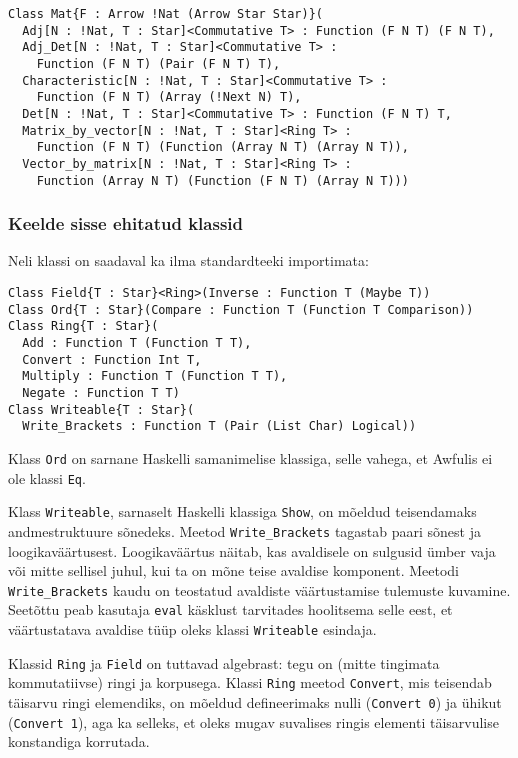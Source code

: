 \documentclass[12pt]{article}
\begin{document}
        \begin{verbatim}Class Mat{F : Arrow !Nat (Arrow Star Star)}(
  Adj[N : !Nat, T : Star]<Commutative T> : Function (F N T) (F N T),
  Adj_Det[N : !Nat, T : Star]<Commutative T> :
    Function (F N T) (Pair (F N T) T),
  Characteristic[N : !Nat, T : Star]<Commutative T> :
    Function (F N T) (Array (!Next N) T),
  Det[N : !Nat, T : Star]<Commutative T> : Function (F N T) T,
  Matrix_by_vector[N : !Nat, T : Star]<Ring T> :
    Function (F N T) (Function (Array N T) (Array N T)),
  Vector_by_matrix[N : !Nat, T : Star]<Ring T> :
    Function (Array N T) (Function (F N T) (Array N T)))\end{verbatim}
      \subsubsection{Keelde sisse ehitatud klassid}
        Neli klassi on saadaval ka ilma standardteeki importimata:

        \begin{verbatim}Class Field{T : Star}<Ring>(Inverse : Function T (Maybe T))
Class Ord{T : Star}(Compare : Function T (Function T Comparison))
Class Ring{T : Star}(
  Add : Function T (Function T T),
  Convert : Function Int T,
  Multiply : Function T (Function T T),
  Negate : Function T T)
Class Writeable{T : Star}(
  Write_Brackets : Function T (Pair (List Char) Logical))\end{verbatim}

        Klass \verb!Ord! on sarnane Haskelli samanimelise klassiga, selle vahega, et Awfulis ei ole klassi \verb!Eq!.

        Klass \verb!Writeable!, sarnaselt Haskelli klassiga \verb!Show!, on mõeldud teisendamaks andmestruktuure sõnedeks. Meetod \verb!Write_Brackets! tagastab paari sõnest ja loogikaväärtusest. Loogikaväärtus näitab, kas avaldisele on sulgusid ümber vaja või mitte sellisel juhul, kui ta on mõne teise avaldise komponent. Meetodi \verb!Write_Brackets! kaudu on teostatud avaldiste väärtustamise tulemuste kuvamine. Seetõttu peab kasutaja \verb!eval! käsklust tarvitades hoolitsema selle eest, et väärtustatava avaldise tüüp oleks klassi \verb!Writeable! esindaja.

        Klassid \verb!Ring! ja \verb!Field! on tuttavad algebrast: tegu on (mitte tingimata kommutatiivse) ringi ja korpusega. Klassi \verb!Ring! meetod \verb!Convert!, mis teisendab täisarvu ringi elemendiks, on mõeldud defineerimaks nulli (\verb!Convert 0!) ja ühikut (\verb!Convert 1!), aga ka selleks, et oleks mugav suvalises ringis elementi täisarvulise konstandiga korrutada.
\end{document}
